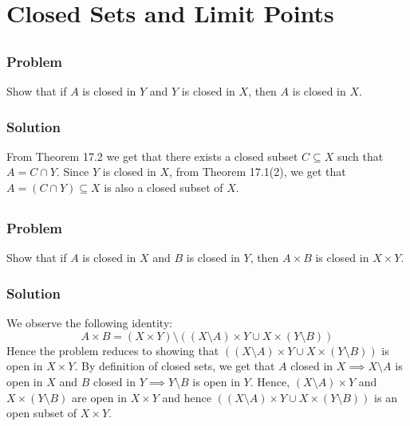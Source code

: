 \setcounter{section}{16} %
\section{Closed Sets and Limit Points}
\label{sec-topspace-closed}


\setcounter{subsection}{1} %
\subsection{}

\subsubsection{Problem}
Show that if $A$ is closed in $Y$ and $Y$ is closed in $X$, then $A$ is closed in $X$.
\subsubsection{Solution}
From Theorem 17.2 we get that there exists a closed subset $C \subseteq X$ such that $A = C \cap Y$. Since $Y$ is closed in $X$, from Theorem 17.1(2), we get that $A = (C \cap Y) \subseteq X$ is also a closed subset of $X$.


\subsection{}

\subsubsection{Problem}
Show that if $A$ is closed in $X$ and $B$ is closed in $Y$, then $A \times B$ is closed in $X \times Y$.
\subsubsection{Solution}
We observe the following identity:
\[ A \times B = (X \times Y) \setminus ((X\setminus A) \times Y \cup X \times (Y \setminus B)) \]
Hence the problem reduces to showing that $((X\setminus A) \times Y \cup X \times (Y \setminus B))$ is open in $X \times Y$.
By definition of closed sets, we get that $A$ closed in $X \implies X\setminus A$ is open in $X$ and $B$ closed in $Y \implies Y\setminus B$ is open in $Y$. Hence, $(X\setminus A) \times Y$ and $X \times (Y \setminus B)$ are open in $X \times Y$ and hence $((X\setminus A) \times Y \cup X \times (Y \setminus B))$ is an open subset of $X \times Y$.

